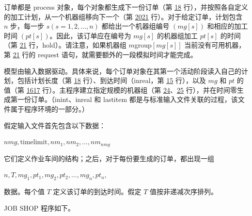 \documentclass[twoside,11pt,fontset=none]{ctexbook}
\begin{document}
订单都是 process 对象，每个对象都生成下一份订单（第 \hyperref[pg:program-job-shop-18]{18} 行），并按照各自定义的加工计划，从一个机器组移向下一个（第 \hyperref[pg:program-job-shop-20]{20}\textendash \hyperref[pg:program-job-shop-21]{21} 行）。对于给定订单，计划包含 $n$ 步，每一步 $s(s = 1, 2, \dots, n)$ 都给出一个机器组编号 $(mg[s])$ 和相应的加工时间 $(pt[s])$。因此，该订单应在编号为 $mg[s]$ 的机器组加工 $pt[s]$ 的时间（第 \hyperref[pg:program-job-shop-21]{21} 行，hold）。请注意，如果机器组 $m$group$[mg[s]]$ 当前没有可用机器，第 \hyperref[pg:program-job-shop-21]{21} 行的 request 语句，就需要额外的一段模拟时间才能完成。

模型由输入数据驱动。具体来说，每个订单对象在其第一个活动阶段读入自己的计划，包括计划长度（第 \hyperref[pg:program-job-shop-18]{18} 行）、到达时间（inreal，第 \hyperref[pg:program-job-shop-15]{15} 行），以及 $mg$ 和 $pt$ 的值（第 \hyperref[pg:program-job-shop-16]{16}\textendash\hyperref[pg:program-job-shop-17]{17} 行）。主程序建立指定规模的机器组（第 \hyperref[pg:program-job-shop-24]{24}、\hyperref[pg:program-job-shop-25]{25} 行），并在时间零生成第一份订单。（inint、inreal 和 lastitem 都是与标准输入文件关联的过程，该文件属于程序环境的一部分。）

假定输入文件首先包含以下数据：

\quad $nmg, \text{timelimit}, nm_1, nm_2, \dots, nm_{nmg}$

\noindent
它们定义作业车间的结构；之后，对于每份要生成的订单，都出现一组

\quad $n, T, mg_1, pt_1, mg_2, pt_2, \dots, mg_n, pt_n,$

\noindent
数据。每个值 $T$ 定义该订单的到达时间。假定 $T$ 值按非递减次序排列。

JOB SHOP 程序如下。
\end{document}

